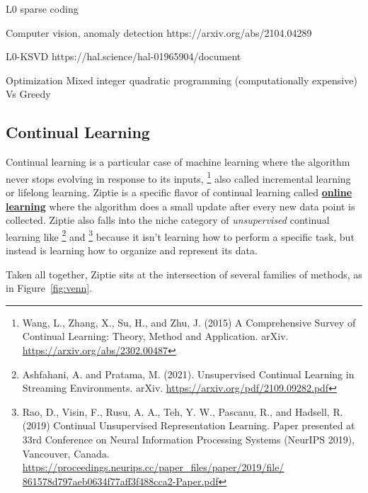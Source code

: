 L0 sparse coding

Computer vision, anomaly detection
https://arxiv.org/abs/2104.04289

L0-KSVD
https://hal.science/hal-01965904/document

Optimization
Mixed integer quadratic programming (computationally expensive)
Vs
Greedy

\subsection{Continual Learning}
\label{subsec:continual}

Continual learning is a particular case of machine learning where the
algorithm never stops evolving in response to its inputs,
\footnote{Wang, L., Zhang, X., Su, H., and Zhu, J. (2015)
A Comprehensive Survey of Continual Learning: Theory, Method and Application.
arXiv.
\href{https://arxiv.org/abs/2302.00487}{https://arxiv.org/abs/2302.00487}
}
also called incremental learning or lifelong learning.
Ziptie is a specific flavor of continual learning called
\textbf{\href{https://en.wikipedia.org/wiki/Online_machine_learning}{online learning}}
where the algorithm does a small update after every new data point is collected.
Ziptie also falls into the niche category of \textit{unsupervised}
continual learning like
\footnote{Ashfahani, A. and Pratama, M. (2021).
Unsupervised Continual Learning in Streaming Environments. arXiv.
\href{https://arxiv.org/pdf/2109.09282.pdf}{https://arxiv.org/pdf/2109.09282.pdf}
}
and
\footnote{Rao, D., Visin, F., Rusu, A. A., Teh, Y. W., Pascanu, R., and Hadsell, R.
(2019) Continual Unsupervised Representation Learning.
Paper presented at 33rd Conference on Neural Information Processing Systems
(NeurIPS 2019), Vancouver, Canada.
\href{https://proceedings.neurips.cc/paper_files/paper/2019/file/861578d797aeb0634f77aff3f488cca2-Paper.pdf}
{https://proceedings.neurips.cc/paper\_files/paper/2019/file/ 861578d797aeb0634f77aff3f488cca2-Paper.pdf}
}
because it isn't learning how to perform a specific task, but instead is
learning how to organize and represent its data. 


Taken all together, Ziptie sits at the intersection 
of several families of methods, as in Figure~\ref{fig:venn}.

